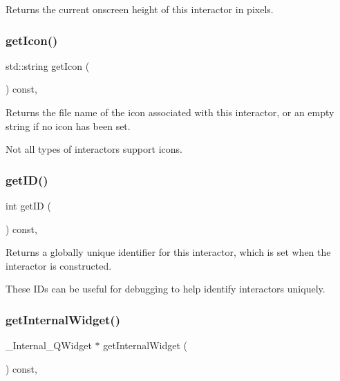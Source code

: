 Returns the current onscreen height of this interactor in pixels. 

\mbox{\label{classsgl_1_1GInteractor_aaed62a73004939a64da6f0eb9eb64d73}} 
\subsubsection{\texorpdfstring{get\+Icon()}{getIcon()}}
{\footnotesize\ttfamily std\+::string get\+Icon (\begin{DoxyParamCaption}{ }\end{DoxyParamCaption}) const\hspace{0.3cm}{\ttfamily [virtual]}, {\ttfamily [inherited]}}



Returns the file name of the icon associated with this interactor, or an empty string if no icon has been set. 

Not all types of interactors support icons. \mbox{\label{classsgl_1_1GInteractor_a9c9659a6c6ba66b4107ba59c95a24241}} 
\subsubsection{\texorpdfstring{get\+I\+D()}{getID()}}
{\footnotesize\ttfamily int get\+ID (\begin{DoxyParamCaption}{ }\end{DoxyParamCaption}) const\hspace{0.3cm}{\ttfamily [virtual]}, {\ttfamily [inherited]}}



Returns a globally unique identifier for this interactor, which is set when the interactor is constructed. 

These I\+Ds can be useful for debugging to help identify interactors uniquely. \mbox{\label{classsgl_1_1GCanvas_a2f6b36b2517087dc90a366b5ce1f5323}} 
\subsubsection{\texorpdfstring{get\+Internal\+Widget()}{getInternalWidget()}}
{\footnotesize\ttfamily \+\_\+\+Internal\+\_\+\+Q\+Widget $\ast$ get\+Internal\+Widget (\begin{DoxyParamCaption}{ }\end{DoxyParamCaption}) const\hspace{0.3cm}{\ttfamily [override]}, {\ttfamily [virtual]}}



